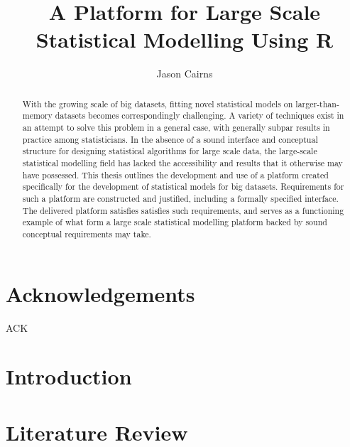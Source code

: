 \documentclass[11pt,a4paper,partial,examcopy]{aucklandthesis} %
\title{A Platform for Large Scale Statistical Modelling Using R}
\author{Jason Cairns}
\begin{document}
\maketitle


\begin{abstract}
    With the growing scale of big datasets, fitting novel statistical models on larger-than-memory datasets becomes correspondingly challenging.
    A variety of techniques exist in an attempt to solve this problem in a general case, with generally subpar results in practice among statisticians.
    In the absence of a sound interface and conceptual structure for designing statistical algorithms for large scale data, the large-scale statistical modelling field has lacked the accessibility and results that it otherwise may have possessed.
    This thesis outlines the development and use of a platform created specifically for the development of statistical models for big datasets.
    Requirements for such a platform are constructed and justified, including a formally specified interface.
    The delivered platform satisfies satisfies such requirements, and serves as a functioning example of what form a large scale statistical modelling platform backed by sound conceptual requirements may take.
\end{abstract}


\chapter*{Acknowledgements}
\textsc{ACK}

\newpage
{}
\tableofcontents
\newpage
\listoffigures
\newpage
\listoftables
\newpage
\listoflistings
{}

\chapter{Introduction}


\chapter{Literature Review}

\end{document}
